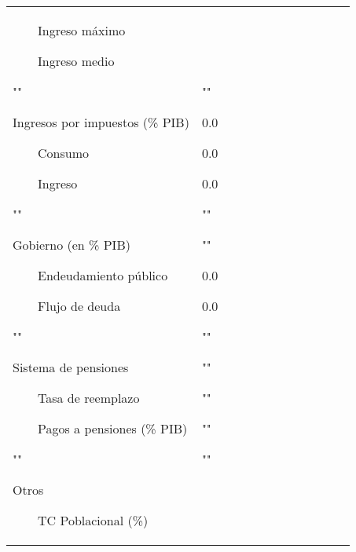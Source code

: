 \documentclass[10pt,a4paper]{report}
\newcommand{\tabitem}{~~\llap{\textbullet}~~}
\begin{document}
\begin{landscape}
\begin{longtable}{p{5cm} p{1cm} p{1cm} p{1cm} p{1cm} p{1cm} p{1cm} p{1cm} p{1cm} p{1cm} p{1cm} p{1cm}}
\par\tabitem Ingreso máximo

\par\tabitem Ingreso medio


\par ""

Ingresos por impuestos (\% PIB) 

\par\tabitem Consumo 

\par\tabitem Ingreso

\par ""

Gobierno (en \% PIB)
\par\tabitem Endeudamiento público 
\par\tabitem Flujo de deuda

\par ""

Sistema de pensiones 
\par\tabitem Tasa de reemplazo
\par\tabitem Pagos a pensiones (\% PIB)

\par ""

Otros
\par\tabitem TC Poblacional (\%)





&

\par ""
\par 0.0
\par 0.0
\par 0.0

\par ""
\par ""
\par 0.0
\par 0.0
\par ""
\par ""
\par ""
\par ""
\par ""


\end{longtable}
\end{landscape}
\end{document}
